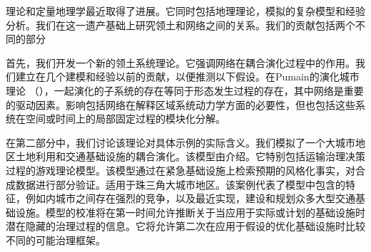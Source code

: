理论和定量地理学最近取得了进展。它同时包括地理理论，模拟的复杂模型和经验分析。我们在这一遗产基础上研究领土和网络之间的关系。我们的贡献包括两个不同的部分

首先，我们开发一个新的领土系统理论。它强调网络在耦合演化过程中的作用。我们建立在几个建模和经验以前的贡献，以便推测以下假设。在Pumain的演化城市理论 （\cite{pumain1997pour}），一起演化的子系统的存在等同于形态发生过程的存在，其中网络是重要的驱动因素。影响包括网络在解释区域系统动力学方面的必要性，但也包括这些系统在空间或时间上的局部固定过程的模块化分解。

在第二部分中，我们讨论该理论对具体示例的实际含义。我们模拟了一个大城市地区土地利用和交通基础设施的耦合演化。该模型由\cite{le2015modeling}介绍。它特别包括运输治理决策过程的游戏理论模型。该模型通过在紧急基础设施上检索预期的风格化事实，对合成数据进行部分验证。适用于珠三角大城市地区。该案例代表了模型中包含的特征，例如内城市之间存在强烈的竞争，以及最近实现，建设和规划众多大型交通基础设施。模型的校准将在第一时间允许推断关于当应用于实际或计划的基础设施时潜在隐藏的治理过程的信息。它将允许第二次在应用于假设的优化基础设施时比较不同的可能治理框架。




\bigskip
\bigskip











